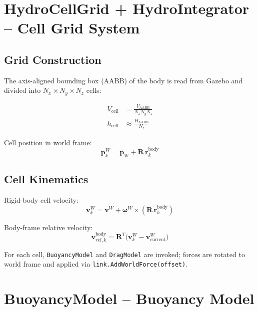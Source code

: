 \documentclass[12pt,a4paper]{article}
\begin{document}
\section{HydroCellGrid + HydroIntegrator -- Cell Grid System}

\subsection{Grid Construction}

The axis-aligned bounding box (AABB) of the body is read from Gazebo and
divided into $N_x \times N_y \times N_z$ cells:

\begin{align}
  V_{\text{cell}} &= \frac{V_{\text{AABB}}}{N_x N_y N_z}
  \label{eq:cell_vol} \\[4pt]
  h_{\text{cell}} &\approx \frac{H_{\text{AABB}}}{N_z}
  \label{eq:cell_h}
\end{align}

Cell position in world frame:
\begin{equation}
  \mathbf{p}_{k}^W = \mathbf{p}_W + \mathbf{R}\,\mathbf{r}_{k}^{\text{body}}
  \label{eq:cell_pos}
\end{equation}

\subsection{Cell Kinematics}

Rigid-body cell velocity:
\begin{equation}
  \mathbf{v}_{k}^W = \mathbf{v}^W + \boldsymbol{\omega}^W \times
  (\mathbf{R}\,\mathbf{r}_{k}^{\text{body}})
  \label{eq:cell_vel}
\end{equation}

Body-frame relative velocity:
\begin{equation}
  \mathbf{v}_{rel,k}^{\text{body}}
    = \mathbf{R}^T\!\bigl(\mathbf{v}_{k}^W - \mathbf{v}_{\text{current}}^W\bigr)
  \label{eq:cell_rel_vel}
\end{equation}

For each cell, \texttt{BuoyancyModel} and \texttt{DragModel} are invoked;
forces are rotated to world frame and applied via \texttt{link.AddWorldForce(offset)}.

\section{BuoyancyModel -- Buoyancy Model}
\end{document}
